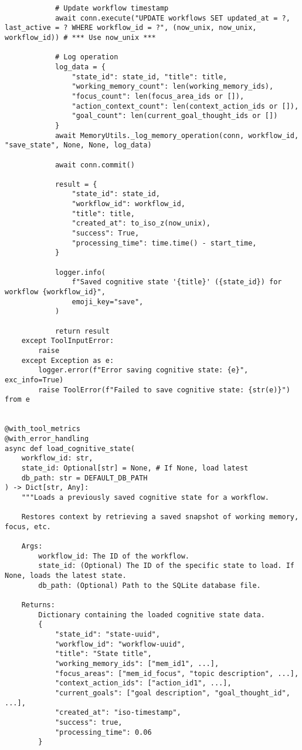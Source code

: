 \documentclass[12pt,a4paper]{article}
\begin{document}
\begin{pageablecode}
\begin{verbatim}
            # Update workflow timestamp
            await conn.execute("UPDATE workflows SET updated_at = ?, last_active = ? WHERE workflow_id = ?", (now_unix, now_unix, workflow_id)) # *** Use now_unix ***

            # Log operation
            log_data = {
                "state_id": state_id, "title": title,
                "working_memory_count": len(working_memory_ids),
                "focus_count": len(focus_area_ids or []),
                "action_context_count": len(context_action_ids or []),
                "goal_count": len(current_goal_thought_ids or [])
            }
            await MemoryUtils._log_memory_operation(conn, workflow_id, "save_state", None, None, log_data)

            await conn.commit()

            result = {
                "state_id": state_id,
                "workflow_id": workflow_id,
                "title": title,
                "created_at": to_iso_z(now_unix),
                "success": True,
                "processing_time": time.time() - start_time,
            }

            logger.info(
                f"Saved cognitive state '{title}' ({state_id}) for workflow {workflow_id}",
                emoji_key="save",
            )

            return result
    except ToolInputError:
        raise
    except Exception as e:
        logger.error(f"Error saving cognitive state: {e}", exc_info=True)
        raise ToolError(f"Failed to save cognitive state: {str(e)}") from e
    

@with_tool_metrics
@with_error_handling
async def load_cognitive_state(
    workflow_id: str,
    state_id: Optional[str] = None, # If None, load latest
    db_path: str = DEFAULT_DB_PATH
) -> Dict[str, Any]:
    """Loads a previously saved cognitive state for a workflow.

    Restores context by retrieving a saved snapshot of working memory, focus, etc.

    Args:
        workflow_id: The ID of the workflow.
        state_id: (Optional) The ID of the specific state to load. If None, loads the latest state.
        db_path: (Optional) Path to the SQLite database file.

    Returns:
        Dictionary containing the loaded cognitive state data.
        {
            "state_id": "state-uuid",
            "workflow_id": "workflow-uuid",
            "title": "State title",
            "working_memory_ids": ["mem_id1", ...],
            "focus_areas": ["mem_id_focus", "topic description", ...],
            "context_action_ids": ["action_id1", ...],
            "current_goals": ["goal description", "goal_thought_id", ...],
            "created_at": "iso-timestamp",
            "success": true,
            "processing_time": 0.06
        }


\end{verbatim}
\end{pageablecode}
\end{document}
